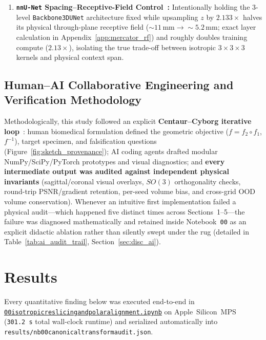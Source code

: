 \documentclass[10pt,a4paper]{article}
\renewcommand{\_}{\origunderscore\allowbreak}
\newcommand{\ghblob}{https://github.com/arvidl/BMED365-2027/blob/main}
\newcommand{\repodir}{Lab4-Comp-Imag/Kiwi-challenge/docs/neurosymbolic-report}
\newcommand{\nbref}[1]{\href{\ghblob/\repodir/notebooks/#1}{\texttt{#1}}}
\begin{document}
\begin{enumerate}
    \item \textbf{\texttt{nnU-Net} Spacing--Receptive-Field Control~\cite{isensee2021nnunet}:} Intentionally holding the 3-level \texttt{Backbone3DUNet} architecture fixed while upsampling $z$ by $2.133\times$ halves its physical through-plane receptive field ($\sim 11\,\text{mm} \to \sim 5.2\,\text{mm}$; exact layer calculation in Appendix~\ref{app:mercator_rf}) and roughly doubles training compute ($2.13\times$), isolating the true trade-off between isotropic $3\times 3\times 3$ kernels and physical context span.
\end{enumerate}

\subsection{Human--AI Collaborative Engineering and Verification Methodology}
\label{sec:meth_ai}

Methodologically, this study followed an explicit \textbf{Centaur--Cyborg iterative loop}~\cite{mollick2026coexistence}: human biomedical formulation defined the geometric objective ($f = f_2 \circ f_1$, $f^{-1}$), target specimen, and falsification questions (Figure~\ref{fig:sketch_provenance}); AI coding agents drafted modular NumPy/SciPy/PyTorch prototypes and visual diagnostics; and \textbf{every intermediate output was audited against independent physical invariants} (sagittal/coronal visual overlays, $SO(3)$ orthogonality checks, round-trip PSNR/gradient retention, per-seed volume bias, and cross-grid OOD volume conservation). Whenever an intuitive first implementation failed a physical audit---which happened five distinct times across Sections~1--5---the failure was diagnosed mathematically and retained inside Notebook~\texttt{00} as an explicit didactic ablation rather than silently swept under the rug (detailed in Table~\ref{tab:ai_audit_trail}, Section~\ref{sec:disc_ai}).

\clearpage
\section{Results}
\label{sec:results}

Every quantitative finding below was executed end-to-end in \nbref{00\_isotropic\_reslicing\_and\_polar\_alignment.ipynb} on Apple~Silicon~MPS (\texttt{301.2\,s} total wall-clock runtime) and serialized automatically into \texttt{results/nb00\_canonical\_transform\_audit.json}.
\end{document}
